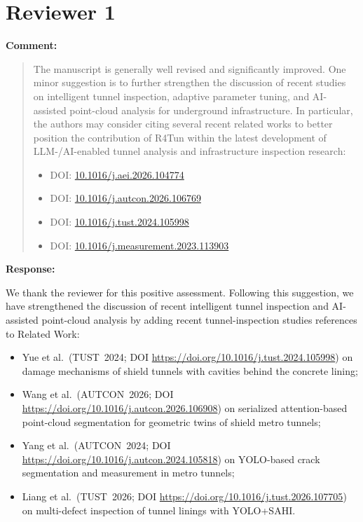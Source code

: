 \documentclass[11pt,a4paper]{article}
\newenvironment{commentblock}{%
  \par\smallskip\noindent\textbf{Comment:}\par
  \begin{quote}\itshape\color{black}
}{%
  \end{quote}\smallskip
}
\newenvironment{responseblock}{%
  \par\smallskip\noindent\textbf{Response:}\par
  \begingroup\color{responsegreen}
}{%
  \endgroup\smallskip
}
\begin{document}
\section*{Reviewer 1}

\begin{commentblock}
The manuscript is generally well revised and significantly improved. One minor suggestion is to further strengthen the discussion of recent studies on intelligent tunnel inspection, adaptive parameter tuning, and AI-assisted point-cloud analysis for underground infrastructure. In particular, the authors may consider citing several recent related works to better position the contribution of R4Tun within the latest development of LLM-/AI-enabled tunnel analysis and infrastructure inspection research:
\begin{itemize}[nosep]
  \item DOI: \url{10.1016/j.aei.2026.104774}
  \item DOI: \url{10.1016/j.autcon.2026.106769}
  \item DOI: \url{10.1016/j.tust.2024.105998}
  \item DOI: \url{10.1016/j.measurement.2023.113903}
\end{itemize}
\end{commentblock}
\begin{responseblock}
We thank the reviewer for this positive assessment. Following this suggestion, we have strengthened the discussion of recent intelligent tunnel inspection and AI-assisted point-cloud analysis by adding recent tunnel-inspection studies references to Related Work:
\begin{itemize}[nosep]
  \item Yue et al.\ (TUST~2024; DOI \url{https://doi.org/10.1016/j.tust.2024.105998}) on damage mechanisms of shield tunnels with cavities behind the concrete lining;
  \item Wang et al.\ (AUTCON~2026; DOI \url{https://doi.org/10.1016/j.autcon.2026.106908}) on serialized attention-based point-cloud segmentation for geometric twins of shield metro tunnels;
  \item Yang et al.\ (AUTCON~2024; DOI \url{https://doi.org/10.1016/j.autcon.2024.105818}) on YOLO-based crack segmentation and measurement in metro tunnels;
  \item Liang et al.\ (TUST~2026; DOI \url{https://doi.org/10.1016/j.tust.2026.107705}) on multi-defect inspection of tunnel linings with YOLO+SAHI.
\end{itemize}
\end{responseblock}
\end{document}
